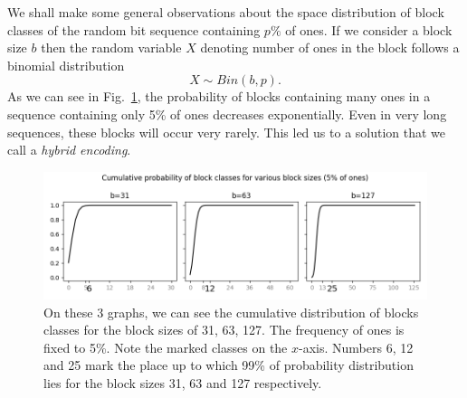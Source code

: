 We shall make some general observations about the space distribution of block
classes of the random bit sequence containing $p\%$ of ones. If we consider a
block size $b$ then the random variable $X$ denoting number of ones in the
block follows a binomial distribution $$X \sim Bin(b,p).$$ As we can see in
Fig.~\ref{obr:hybridEncodingDistribution}, the probability of blocks
containing many ones in a sequence containing only 5\% of ones
decreases exponentially. Even in very long sequences, these blocks will
occur very rarely. This led us to a solution that we call a \textit{hybrid encoding}.

\begin{figure}
	\centerline{
		\includegraphics[width=\textwidth]{images/hybrid_encoding_motivation}
	}
	\caption[TODO]{On these 3 graphs, we can see the cumulative distribution
    of blocks classes for the block sizes of 31, 63, 127. The frequency of ones is
    fixed to 5\%. Note the marked classes on the $x$-axis. Numbers 6, 12 and
    25 mark the place up to which 99\% of probability distribution lies for
    the block sizes 31, 63 and 127 respectively.
	}
	\label{obr:hybridEncodingDistribution}
\end{figure}

